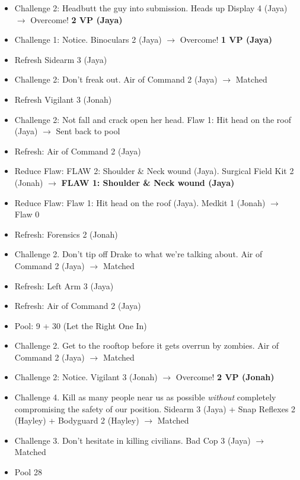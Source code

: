 \begin{itemize}[noitemsep,topsep=0pt]
\item Challenge 2: Headbutt the guy into submission.  Heads up Display 4 (Jaya) $\rightarrow$ Overcome! \textbf{2 VP (Jaya)}
\item Challenge 1: Notice.  Binoculars 2 (Jaya) $\rightarrow$ Overcome! \textbf{1 VP (Jaya)}
\item Refresh Sidearm 3 (Jaya)
\item Challenge 2: Don't freak out. Air of Command 2 (Jaya) $\rightarrow$ Matched
\item Refresh Vigilant 3 (Jonah)
\item Challenge 2: Not fall and crack open her head.  Flaw 1: Hit head on the roof (Jaya)\textbf{ }$\rightarrow$ Sent back to pool
\item Refresh: Air of Command 2 (Jaya)
\item Reduce Flaw: FLAW 2: Shoulder \& Neck wound (Jaya). {\color[RGB]{255,0,0}  } Surgical Field Kit 2 (Jonah) $\rightarrow$ \textbf{ {\color[RGB]{255,0,0}FLAW 1: Shoulder \& Neck wound (Jaya)} }
\item Reduce Flaw: Flaw 1: Hit head on the roof (Jaya).  Medkit 1 (Jonah) $\rightarrow$ Flaw 0
\item Refresh: Forensics 2 (Jonah)
\item Challenge 2.  Don't tip off Drake to what we're talking about.  Air of Command 2 (Jaya) $\rightarrow$ Matched
\item Refresh: Left Arm 3 (Jaya)
\item Refresh: Air of Command 2 (Jaya)
\item Pool: 9 + 30 (Let the Right One In)
\item Challenge 2.  Get to the rooftop before it gets overrun by zombies.  Air of Command 2 (Jaya) $\rightarrow$ Matched
\item Challenge 2: Notice.  Vigilant 3 (Jonah) $\rightarrow$ Overcome! \textbf{2 VP (Jonah)}
\item Challenge 4. Kill as many people near us as possible \textit{without} completely compromising the safety of our position.  Sidearm 3 (Jaya) + Snap Reflexes 2 (Hayley) + Bodyguard 2 (Hayley) $\rightarrow$ Matched
\item Challenge 3.  Don't hesitate in killing civilians.  Bad Cop 3 (Jaya) $\rightarrow$ Matched
\item Pool 28
\end{itemize}





